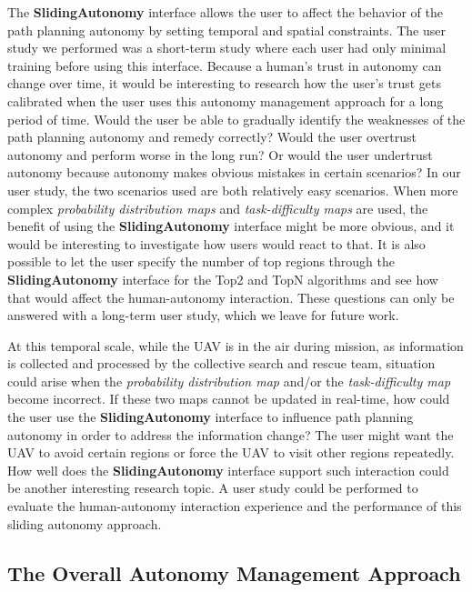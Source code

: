 The \textbf{SlidingAutonomy} interface allows the user to affect the behavior of the path planning autonomy by setting temporal and spatial constraints. The user study we performed was a short-term study where each user had only minimal training before using this interface. Because a human's trust in autonomy can change over time, it would be interesting to research how the user's trust gets calibrated when the user uses this autonomy management approach for a long period of time. Would the user be able to gradually identify the weaknesses of the path planning autonomy and remedy correctly? Would the user overtrust autonomy and perform worse in the long run? Or would the user undertrust autonomy because autonomy makes obvious mistakes in certain scenarios? In our user study, the two scenarios used are both relatively easy scenarios. When more complex \textit{probability distribution maps} and \textit{task-difficulty maps} are used, the benefit of using the \textbf{SlidingAutonomy} interface might be more obvious, and it would be interesting to investigate how users would react to that. It is also possible to let the user specify the number of top regions through the \textbf{SlidingAutonomy} interface for the Top2 and TopN algorithms and see how that would affect the human-autonomy interaction. These questions can only be answered with a long-term user study, which we leave for future work.

At this temporal scale, while the UAV is in the air during mission, as information is collected and processed by the collective search and rescue team, situation could arise when the \textit{probability distribution map} and/or the \textit{task-difficulty map} become incorrect. If these two maps cannot be updated in real-time, how could the user use the \textbf{SlidingAutonomy} interface to influence path planning autonomy in order to address the information change? The user might want the UAV to avoid certain regions or force the UAV to visit other regions repeatedly. How well does the \textbf{SlidingAutonomy} interface support such interaction could be another interesting research topic. A user study could be performed to evaluate the human-autonomy interaction experience and the performance of this sliding autonomy approach.


\subsection{The Overall Autonomy Management Approach}


